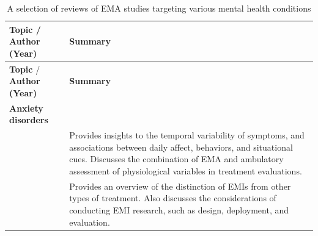 \documentclass[]{book}
\begin{document}
 
 

\begin{longtable}[]{@{}ll@{}}
\caption{\label{tab:emareviews} A selection of reviews of EMA studies
targeting various mental health conditions}\tabularnewline
\toprule
\begin{minipage}[b]{0.33\columnwidth}\raggedright\strut
\textbf{Topic} / \textbf{Author (Year)}\strut
\end{minipage} & \begin{minipage}[b]{0.61\columnwidth}\raggedright\strut
\textbf{Summary}\strut
\end{minipage}\tabularnewline
\midrule
\endfirsthead
\toprule
\begin{minipage}[b]{0.33\columnwidth}\raggedright\strut
\textbf{Topic} / \textbf{Author (Year)}\strut
\end{minipage} & \begin{minipage}[b]{0.61\columnwidth}\raggedright\strut
\textbf{Summary}\strut
\end{minipage}\tabularnewline
\midrule
\endhead
\begin{minipage}[t]{0.33\columnwidth}\raggedright\strut
\textbf{Anxiety disorders}\strut
\end{minipage} & \begin{minipage}[t]{0.61\columnwidth}\raggedright\strut
\strut
\end{minipage}\tabularnewline
\begin{minipage}[t]{0.33\columnwidth}\raggedright\strut
\citet{Walz2014}\strut
\end{minipage} & \begin{minipage}[t]{0.61\columnwidth}\raggedright\strut
Provides insights to the temporal variability of symptoms, and
associations between daily affect, behaviors, and situational cues.
Discusses the combination of EMA and ambulatory assessment of
physiological variables in treatment evaluations.\strut
\end{minipage}\tabularnewline
\begin{minipage}[t]{0.33\columnwidth}\raggedright\strut
\citet{schueller2017}\strut
\end{minipage} & \begin{minipage}[t]{0.61\columnwidth}\raggedright\strut
Provides an overview of the distinction of EMIs from other types of
treatment. Also discusses the considerations of conducting EMI research,
such as design, deployment, and evaluation.\strut

\end{minipage}
\end{longtable}
\end{document}
